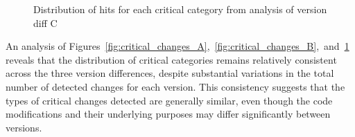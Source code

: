 \begin{figure}[H]
    \centering
    \resizebox{0.8\textwidth}{!}{%
        \begin{tikzpicture}
        \path[%
            dc sector/.append style={shift={(\MedA:5pt)}}, %
            dc dtag/.append style={},
            dc legend/.append style={text width=3cm, align=right},
            every pin/.style={fill=\Cj,draw=\Cj!50!black,thick},
            /DiagCirc/.cd,
            value list={
                37/Data storage,
                6/Authentication,
                42/Logging,
                32/Error handling,
                41/File write,
                69/Cryptographic
            },
            angle max=360,             %
            angle corr={0,0,0,0,0,0},    %
            legend=\N\ :\hfill \V,     %
            factor=.9,
            percent corr={0,0,0,0,0,0}, %
            shift sector={0,0,0,0,0,0}, %
            tags={%
                \P                   %
            },
            sup loop={%
                \def\Pin{{240, 70, 170, 160, 230, 330}}
                \pgfmathparse{array(\Pin,\j)}
                \edef\Pinj{\pgfmathresult}
                \node[pin=\Pinj:\N] at (DC\j) {};
            },
            diagram] ;
        
        \end{tikzpicture}
    }
    \caption{Distribution of hits for each critical category from analysis of version diff C}
    \label{fig:critical_changes_C}
\end{figure}

An analysis of Figures~\ref{fig:critical_changes_A},~\ref{fig:critical_changes_B},~and~\ref{fig:critical_changes_C} reveals that the distribution of critical categories remains relatively consistent across the three version differences, despite substantial variations in the total number of detected changes for each version. This consistency suggests that the types of critical changes detected are generally similar, even though the code modifications and their underlying purposes may differ significantly between versions.

